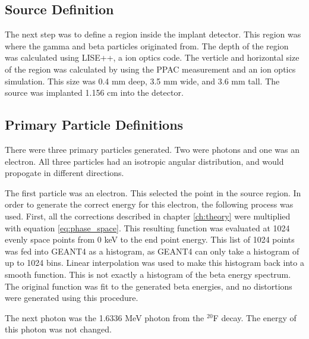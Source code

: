 \subsection{Source Definition}
The next step was to define a region inside the implant detector.
This region was where the gamma and beta particles originated from.
The depth of the region was calculated using LISE++, a ion optics code.
The verticle and horizontal size of the region was calculated by using the PPAC measurement and an ion optics simulation.
This size was 0.4 mm deep, 3.5 mm wide, and 3.6 mm tall.
The source was implanted 1.156 cm into the detector.

\subsection{Primary Particle Definitions}
There were three primary particles generated.
Two were photons and one was an electron.
All three particles had an isotropic angular distribution, and would propogate in different directions.

The first particle was an electron. 
This selected the point in the source region.
In order to generate the correct energy for this electron, the following process was used.
First, all the corrections described in chapter \ref{ch:theory} were multiplied with equation \ref{eq:phase_space}.
This resulting function was evaluated at 1024 evenly space points from 0 keV to the end point energy.
This list of 1024 points was fed into GEANT4 as a histogram, as GEANT4 can only take a histogram of up to 1024 bins. 
Linear interpolation was used to make this histogram back into a smooth function.
This is not exactly a histogram of the beta energy spectrum.
The original function was fit to the generated beta energies, and no distortions were generated using this procedure.

The next photon was the 1.6336 MeV photon from the $^{20}$F decay.
The energy of this photon was not changed.

